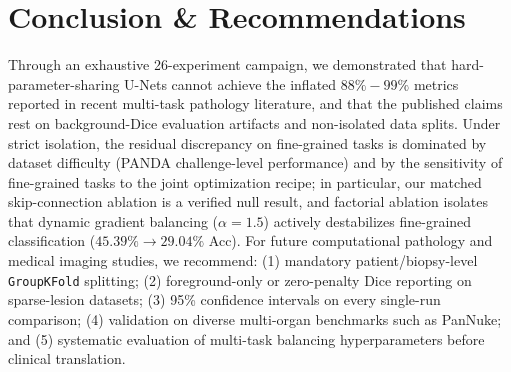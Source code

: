 \documentclass[runningheads]{llncs}
\begin{document}
\section{Conclusion \& Recommendations}
Through an exhaustive 26-experiment campaign, we demonstrated that hard-parameter-sharing U-Nets cannot achieve the inflated $88\%-99\%$ metrics reported in recent multi-task pathology literature, and that the published claims rest on background-Dice evaluation artifacts and non-isolated data splits. Under strict isolation, the residual discrepancy on fine-grained tasks is dominated by dataset difficulty (PANDA challenge-level performance) and by the sensitivity of fine-grained tasks to the joint optimization recipe; in particular, our matched skip-connection ablation is a verified null result, and factorial ablation isolates that dynamic gradient balancing ($\alpha=1.5$) actively destabilizes fine-grained classification ($45.39\% \to 29.04\%$ Acc). For future computational pathology and medical imaging studies, we recommend: (1) mandatory patient/biopsy-level \texttt{GroupKFold} splitting; (2) foreground-only or zero-penalty Dice reporting on sparse-lesion datasets; (3) 95\% confidence intervals on every single-run comparison; (4) validation on diverse multi-organ benchmarks such as PanNuke; and (5) systematic evaluation of multi-task balancing hyperparameters before clinical translation.



\end{document}
